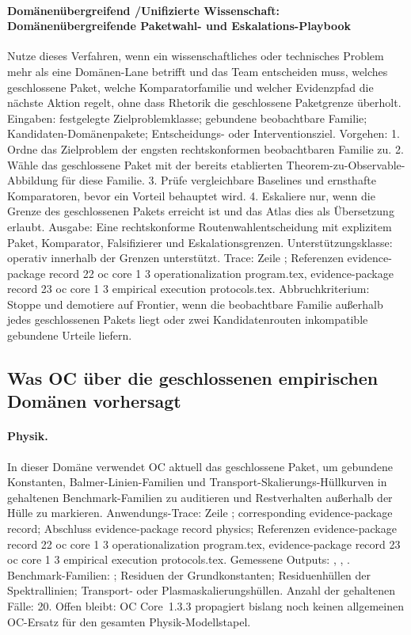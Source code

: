 \paragraph{Domänenübergreifend /\allowbreak Unifizierte Wissenschaft: Domänenübergreifende Paketwahl- und Eskalations-Playbook}
Nutze dieses Verfahren, wenn ein wissenschaftliches oder technisches Problem mehr als eine Domänen-Lane betrifft und das Team entscheiden muss, welches geschlossene Paket, welche Komparatorfamilie und welcher Evidenzpfad die nächste Aktion regelt, ohne dass Rhetorik die geschlossene Paketgrenze überholt.
Eingaben: festgelegte Zielproblemklasse; \allowbreak gebundene beobachtbare Familie; \allowbreak Kandidaten-Domänenpakete; \allowbreak Entscheidungs- oder Interventionsziel.
Vorgehen: 1. Ordne das Zielproblem der engsten rechtskonformen beobachtbaren Familie zu. 2. Wähle das geschlossene Paket mit der bereits etablierten Theorem-zu-Observable-Abbildung für diese Familie. 3. Prüfe vergleichbare Baselines und ernsthafte Komparatoren, bevor ein Vorteil behauptet wird. 4. Eskaliere nur, wenn die Grenze des geschlossenen Pakets erreicht ist und das Atlas dies als Übersetzung erlaubt.
Ausgabe: Eine rechtskonforme Routenwahlentscheidung mit explizitem Paket, Komparator, Falsifizierer und Eskalationsgrenzen.
Unterstützungsklasse: operativ innerhalb der Grenzen unterstützt.
Trace: Zeile ; \allowbreak Referenzen evidence-package record 22 oc core 1 3 operationalization program.tex, \allowbreak evidence-package record 23 oc core 1 3 empirical execution protocols.tex.
Abbruchkriterium: Stoppe und demotiere auf Frontier, wenn die beobachtbare Familie außerhalb jedes geschlossenen Pakets liegt oder zwei Kandidatenrouten inkompatible gebundene Urteile liefern.

\subsection{Was OC über die geschlossenen empirischen Domänen vorhersagt}

\paragraph{Physik.}
In dieser Domäne verwendet OC aktuell das geschlossene Paket, um gebundene Konstanten, Balmer-Linien-Familien und Transport-Skalierungs-Hüllkurven in gehaltenen Benchmark-Familien zu auditieren und Restverhalten außerhalb der Hülle zu markieren.
Anwendungs-Trace: Zeile ; corresponding evidence-package record; \allowbreak Abschluss evidence-package record physics; \allowbreak Referenzen evidence-package record 22 oc core 1 3 operationalization program.tex, \allowbreak evidence-package record 23 oc core 1 3 empirical execution protocols.tex.
Gemessene Outputs: , , .
Benchmark-Familien: ; Residuen der Grundkonstanten; Residuenhüllen der Spektrallinien; Transport- oder Plasmaskalierungshüllen.
Anzahl der gehaltenen Fälle: 20.
Offen bleibt: OC Core~1.3.3 propagiert bislang noch keinen allgemeinen OC-Ersatz für den gesamten Physik-Modellstapel.

